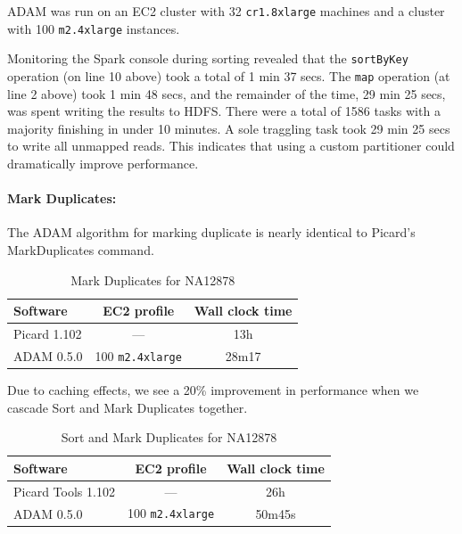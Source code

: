 \documentclass[10pt,twocolumn]{article}
\theoremstyle{plain}
\begin{document}
ADAM was run on an EC2 cluster with 32 \texttt{cr1.8xlarge} machines and
a cluster with 100 \texttt{m2.4xlarge} instances.

Monitoring the Spark console during sorting revealed that the \texttt{sortByKey}
operation (on line 10 above) took a total of 1 min 37 secs. The \texttt{map} operation
(at line 2 above) took 1 min 48 secs, and the remainder of the time, 29 min 25 secs, was 
spent writing the results to HDFS. There were a total of 1586 tasks with a majority
finishing in under 10 minutes. A sole traggling task took 29 min 25 secs to write
all unmapped reads. This indicates that using a custom partitioner could dramatically
improve performance.

\paragraph{Mark Duplicates:}
\label{sec:mark-duplicates}

The ADAM algorithm for marking duplicate is nearly identical to Picard's MarkDuplicates
command. 

\begin{table}[h]
\caption{Mark Duplicates for NA12878}
\label{tab:time-mark-duplicates}
\begin{scriptsize}
\begin{center}
\begin{tabular}{| l | c | c |}
\hline
\bf Software & \bf EC2 profile & \bf Wall clock time \\
\hline
Picard 1.102 & --- & 13h \\
ADAM 0.5.0 & 100 \texttt{m2.4xlarge} & 28m17 \\
\hline
\end{tabular}
\end{center}
\end{scriptsize}
\end{table}

Due to caching effects, we see a 20\% improvement in performance when we cascade Sort and Mark Duplicates together.

\begin{table}[h]
\caption{Sort and Mark Duplicates for NA12878}
\label{tab:time-mark-duplicates-sort}
\begin{scriptsize}
\begin{center}
\begin{tabular}{| l | c | c |}
\hline
\bf Software & \bf EC2 profile & \bf Wall clock time \\
\hline
Picard Tools 1.102 & --- & 26h \\
ADAM 0.5.0 & 100 \texttt{m2.4xlarge} & 50m45s \\
\hline
\end{tabular}
\end{center}
\end{scriptsize}
\end{table}
\end{document}
